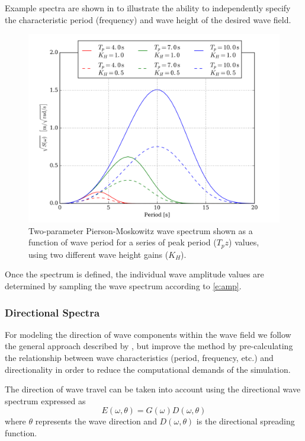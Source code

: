 \documentclass[utf8]{frontiersSCNS} %
\begin{document}
Example spectra are shown in  to illustrate the ability to independently specify the characteristic period (frequency) and wave height of the desired wave field.
\begin{figure}[hbt!]
  \centering
  \includegraphics[width=\SFc\textwidth]{images/pm_spectra_2.png}
  \caption{Two-parameter Pierson-Moskowitz wave spectrum shown as a function of wave period for a series of peak period ($T_pz$) values, using two different wave height gains ($K_H$).}
  \label{f:pm}
\end{figure} 
Once the spectrum is defined, the individual wave amplitude values are determined by sampling the wave spectrum according to \eqref{e:amp}.

\subsubsection{Directional Spectra}
For modeling the direction of wave components within the wave field we follow the general approach described by \citet{frechot06realistic}, but improve the method by pre-calculating the relationship between wave characteristics (period, frequency, etc.) and directionality in order to reduce the computational demands of the simulation.

The direction of wave travel can be taken into account using the directional wave spectrum expressed as
\begin{equation}
  E(\omega,\theta)=G(\omega)D(\omega,\theta)
\end{equation}
where $\theta$ represents the wave direction and $D(\omega,\theta)$ is the directional spreading function. %
\end{document}
